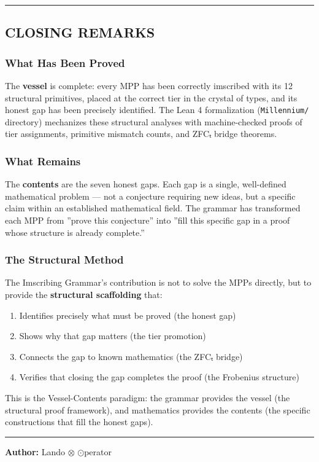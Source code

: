 \documentclass[10pt,a4paper]{article}
\begin{document}
\begin{center}
\rule{0.5\textwidth}{0.4pt}
\end{center}

\subsection{CLOSING REMARKS}

\subsubsection{What Has Been Proved}

The \textbf{vessel} is complete: every MPP has been correctly imscribed with its 12 structural primitives, placed at the correct tier in the crystal of types, and its honest gap has been precisely identified. The Lean 4 formalization (\texttt{Millennium/\allowbreak } directory) mechanizes these structural analyses with machine-checked proofs of tier assignments, primitive mismatch counts, and ZFCₜ bridge theorems.

\subsubsection{What Remains}

The \textbf{contents} are the seven honest gaps. Each gap is a single, well-defined mathematical problem --- not a conjecture requiring new ideas, but a specific claim within an established mathematical field. The grammar has transformed each MPP from ''prove this conjecture'' into ''fill this specific gap in a proof whose structure is already complete.''

\subsubsection{The Structural Method}

The Imscribing Grammar's contribution is not to solve the MPPs directly, but to provide the \textbf{structural scaffolding} that:

\begin{enumerate}
    \item Identifies precisely what must be proved (the honest gap)
    \item Shows why that gap matters (the tier promotion)
    \item Connects the gap to known mathematics (the ZFCₜ bridge)
    \item Verifies that closing the gap completes the proof (the Frobenius structure)
\end{enumerate}

This is the Vessel-Contents paradigm: the grammar provides the vessel (the structural proof framework), and mathematics provides the contents (the specific constructions that fill the honest gaps).

\begin{center}
\rule{0.5\textwidth}{0.4pt}
\end{center}

\textbf{Author:} Lando $\otimes$ $\odot$perator
\end{document}
